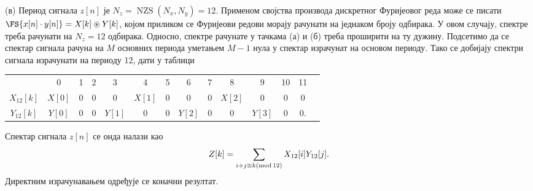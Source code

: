 (в) Период сигнала $z[n]$ је $N_{z} = \operatorname{NZS}(N_x, N_y) = 12$. Применом својства производа дискретног Фуријеовог реда 
може се писати $ \FS{x[n]\cdot y[n]} = X[k] \circledast Y[k]$, којом приликом се Фуријеови редови морају рачунати на једнаком броју 
одбирака. У овом случају, спектре треба рачунати на $N_z = 12$ одбирака. Односно, спектре рачунате у тачкама (а) и (б) треба проширити на ту дужину. 
Подсетимо да се спектар сигнала рачуна на $M$ основних периода уметањем $M-1$ нула у спектар израчунат на основом периоду. Тако се добијају 
спектри сигнала израчунати на периоду 12, дати у таблици \\
\begin{tabular}{c|ccccccccccccc}
            & 0 & 1 & 2 & 3 & 4 & 5 & 6 & 7 & 8 & 9 & 10 & 11 \\
    $X_{12}[k]$ & $X[0]$ & 0 & 0 & 0 & $X[1]$ & 0 & 0 & 0 & $X[2]$ & 0 & 0 & 0 \\
    $Y_{12}[k]$ & $Y[0]$ & 0 & 0 & $Y[1]$ & 0 & 0 & $Y[2]$ & 0 & 0 & $Y[3]$ & 0 & 0.  \\
\end{tabular} 

\noindent
Спектар сигнала $z[n]$ се онда налази као 
\begin{equation}
    Z[k] = \sum_{i + j \equiv k ({\rm mod}\, 12)} X_{12}[i] Y_{12}[j].
\end{equation}
Директним израчунавањем одређује се коначни резултат.